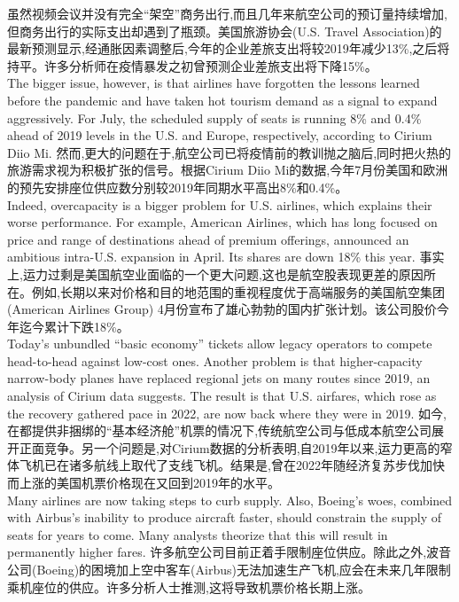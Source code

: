 \documentclass[a4paper,12pt]{article}
\begin{document}
虽然视频会议并没有完全“架空”商务出行,而且几年来航空公司的预订量持续增加,但商务出行的实际支出却遇到了瓶颈。美国旅游协会(U.S. Travel Association)的最新预测显示,经通胀因素调整后,今年的企业差旅支出将较2019年减少13\%,之后将持平。许多分析师在疫情暴发之初曾预测企业差旅支出将下降15\%。
\\The bigger issue, however, is that airlines have forgotten the lessons learned before the pandemic and have taken hot tourism demand as a signal to expand aggressively. For July, the scheduled supply of seats is running 8\% and 0.4\% ahead of 2019 levels in the U.S. and Europe, respectively, according to Cirium Diio Mi.
然而,更大的问题在于,航空公司已将疫情前的教训抛之脑后,同时把火热的旅游需求视为积极扩张的信号。根据Cirium Diio Mi的数据,今年7月份美国和欧洲的预先安排座位供应数分别较2019年同期水平高出8\%和0.4\%。
\\Indeed, overcapacity is a bigger problem for U.S. airlines, which explains their worse performance. For example, American Airlines, which has long focused on price and range of destinations ahead of premium offerings, announced an ambitious intra-U.S. expansion in April. Its shares are down 18\% this year.
事实上,运力过剩是美国航空业面临的一个更大问题,这也是航空股表现更差的原因所在。例如,长期以来对价格和目的地范围的重视程度优于高端服务的美国航空集团(American Airlines Group) 4月份宣布了雄心勃勃的国内扩张计划。该公司股价今年迄今累计下跌18\%。
\\Today's unbundled “basic economy” tickets allow legacy operators to compete head-to-head against low-cost ones. Another problem is that higher-capacity narrow-body planes have replaced regional jets on many routes since 2019, an analysis of Cirium data suggests. The result is that U.S. airfares, which rose as the recovery gathered pace in 2022, are now back where they were in 2019.
如今,在都提供非捆绑的“基本经济舱”机票的情况下,传统航空公司与低成本航空公司展开正面竞争。另一个问题是,对Cirium数据的分析表明,自2019年以来,运力更高的窄体飞机已在诸多航线上取代了支线飞机。结果是,曾在2022年随经济复苏步伐加快而上涨的美国机票价格现在又回到2019年的水平。
\\Many airlines are now taking steps to curb supply. Also, Boeing's woes, combined with Airbus's inability to produce aircraft faster, should constrain the supply of seats for years to come. Many analysts theorize that this will result in permanently higher fares.
许多航空公司目前正着手限制座位供应。除此之外,波音公司(Boeing)的困境加上空中客车(Airbus)无法加速生产飞机,应会在未来几年限制乘机座位的供应。许多分析人士推测,这将导致机票价格长期上涨。
\end{document}
